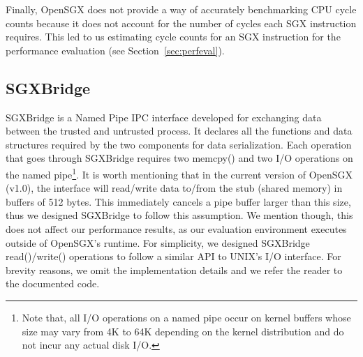 \documentclass[../main.tex]{subfiles}
\begin{document}
Finally, OpenSGX does not provide a way of accurately benchmarking
CPU cycle counts because it does not account for the number of cycles
each SGX instruction requires. This led to us estimating cycle counts
for an SGX instruction for the performance evaluation (see
Section~\ref{sec:perfeval}).




%

\subsection{SGXBridge}
\label{subsec:sgxbridge}

SGXBridge is a Named Pipe IPC interface developed for exchanging data between
the trusted and untrusted process. It declares all the functions and data
structures required by the two components for data serialization. Each operation
that goes through SGXBridge requires two memcpy() and two I/O operations on the
named pipe\footnote{Note that, all I/O operations on a named pipe occur on
kernel buffers whose size may vary from 4K to 64K depending on the kernel
distribution and do not incur any actual disk I/O.}. It is worth mentioning
that in the current version of OpenSGX (v1.0), the interface will read/write
data to/from the stub (shared memory) in buffers of 512 bytes. This immediately
cancels a pipe buffer larger than this size, thus we designed SGXBridge to
follow this assumption. We mention though, this does not affect our performance
results, as our evaluation environment executes outside of OpenSGX's
runtime. For simplicity, we designed SGXBridge read()/write() operations to
follow a similar API to UNIX's I/O interface. For brevity reasons, we omit the
implementation details and we refer the reader to the documented code.
\end{document}
